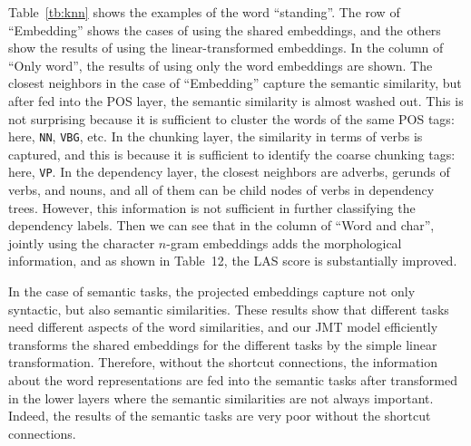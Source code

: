\documentclass[11pt,a4paper]{article}
\begin{document}
Table~\ref{tb:knn} shows the examples of the word ``standing''.
The row of ``Embedding'' shows the cases of using the shared embeddings, and the others show the results of using the linear-transformed embeddings.
In the column of ``Only word'', the results of using only the word embeddings are shown.
The closest neighbors in the case of ``Embedding'' capture the semantic similarity, but after fed into the POS layer, the semantic similarity is almost washed out.
This is not surprising because it is sufficient to cluster the words of the same POS tags: here, {\tt NN}, {\tt VBG}, etc.
In the chunking layer, the similarity in terms of verbs is captured, and this is because it is sufficient to identify the coarse chunking tags: here, {\tt VP}.
In the dependency layer, the closest neighbors are adverbs, gerunds of verbs, and nouns, and all of them can be child nodes of verbs in dependency trees.
However, this information is not sufficient in further classifying the dependency labels.
Then we can see that in the column of ``Word and char'', jointly using the character $n$-gram embeddings adds the morphological information, and as shown in Table~12, the LAS score is substantially improved.

In the case of semantic tasks, the projected embeddings capture not only syntactic, but also semantic similarities.
These results show that different tasks need different aspects of the word similarities, and our JMT model efficiently transforms the shared embeddings for the different tasks by the simple linear transformation.
Therefore, without the shortcut connections, the information about the word representations are fed into the semantic tasks after transformed in the lower layers where the semantic similarities are not always important.
Indeed, the results of the semantic tasks are very poor without the shortcut connections.
\end{document}
